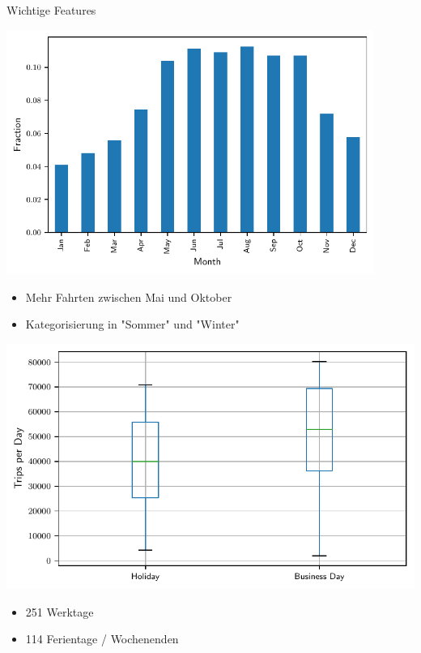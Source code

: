 \begin{frame}{Wichtige Features}
{
\includegraphics[width=0.9\textwidth]{../Images/CountByMonth}
\begin{itemize}
\item Mehr Fahrten zwischen Mai und Oktober
\item Kategorisierung in "Sommer" und "Winter"
\end{itemize}
}
{
\centering
\includegraphics[width=\textwidth]{../Images/CountByBusiness}
\begin{itemize}
\item 251 Werktage
\item 114 Ferientage / Wochenenden
\end{itemize}
}
\end{frame}

